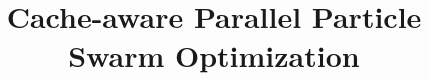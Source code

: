 \documentclass[draft,10pt]{article}
\title{Cache-aware Parallel Particle Swarm Optimization}
\begin{document}
\maketitle
\begin{abstract}
  
\end{abstract}





\end{document}
